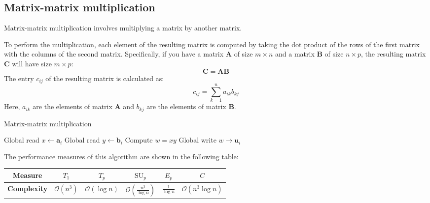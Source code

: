 \subsection{Matrix-matrix multiplication}
Matrix-matrix multiplication involves multiplying a matrix by another matrix.

To perform the multiplication, each element of the resulting matrix is computed by taking the dot product of the rows of the first matrix with the columns of the second matrix. 
Specifically, if you have a matrix $\mathbf{A}$ of size $m\times n$ and a matrix $\mathbf{B}$ of size $n\times p$, the resulting matrix $\mathbf{C}$ will have size $m\times p$:
\[\mathbf{C}=\mathbf{AB}\]
The entry $c_{ij}$ of the resulting matrix is calculated as:
\[c_{ij}=\sum_{k=1}^na_{ik}b_{kj}\]
Here, $a_{ik}$ are the elements of matrix $\mathbf{A}$ and $b_{kj}$ are the elements of matrix $\mathbf{B}$.
\begin{algorithm}[H]
    \caption{Matrix-matrix multiplication}
    \begin{algorithmic}[1]
        \State Global read $x \leftarrow \mathbf{a}_i$ 
        \State Global read $y \leftarrow \mathbf{b}_i$ 
        \State Compute $w = x y$ 
        \State Global write $w \rightarrow \mathbf{u}_i$ 
    \end{algorithmic}
\end{algorithm}  
The performance measures of this algorithm are shown in the following table:
\renewcommand*{\arraystretch}{2}
\begin{table}[H]
    \centering
    \begin{tabular}{|c|ccccc|}
    \hline
    \textbf{Measure} & $T_1$ & $T_p$ & $\text{SU}_p$ & $E_p$ & $C$  \\ \hline
    \textbf{Complexity} & $\mathcal{O}(n^3)$ & $\mathcal{O}\left(\log n\right)$ & $\mathcal{O}\left(\frac{n^3}{\log n}\right)$ & $\frac{1}{\log n}$ & $\mathcal{O}\left(n^3\log n\right)$ \\ \hline
    \end{tabular}
\end{table}
\renewcommand*{\arraystretch}{1}